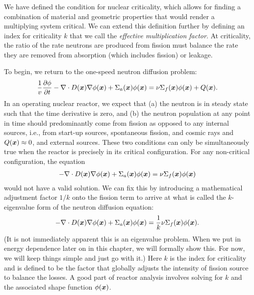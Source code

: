 We have defined the condition for nuclear criticality, which allows for finding a combination of material and geometric properties that would render a multiplying system critical. We can extend this definition further by defining an index for criticality $k$ that we call the \emph{effective multiplication factor}. At criticality, the ratio of the rate neutrons are produced from fission must balance the rate they are removed from absorption (which includes fission) or leakage. 

To begin, we return to the one-speed neutron diffusion problem:
\begin{align}
  \frac{1}{v} \frac{ \partial {\phi} }{ \partial {t} } - \nabla \cdot D(\bm{x})  \nabla \phi(\bm{x}) + \Sigma_a(\bm{x}) \phi(\bm{x}) = \nu \Sigma_f(\bm{x}) \phi(\bm{x}) + Q(\bm{x}). \nonumber
\end{align}
In an operating nuclear reactor, we expect that (a) the neutron is in steady state such that the time derivative is zero, and (b) the neutron population at any point in time should predominantly come from fission as opposed to any internal sources, i.e., from start-up sources, spontaneous fission, and cosmic rays and $Q(\bm{x}) \approx 0$, and external sources. These two conditions can only be simultaneously true when the reactor is precisely in its critical configuration. For any non-critical configuration, the equation 
\begin{align}
   - \nabla \cdot D(\bm{x})  \nabla \phi(\bm{x}) + \Sigma_a(\bm{x}) \phi(\bm{x}) = \nu \Sigma_f(\bm{x}) \phi(\bm{x})  \nonumber
\end{align}
would not have a valid solution. We can fix this by introducing a mathematical adjustment factor $1/k$ onto the fission term to arrive at what is called the $k$-eigenvalue form of the neutron diffusion equation:
\begin{align}
   - \nabla \cdot  D(\bm{x}) \nabla \phi(\bm{x}) + \Sigma_a(\bm{x}) \phi(\bm{x}) = \frac{1}{k} \nu \Sigma_f(\bm{x}) \phi(\bm{x}) .
\end{align}
(It is not immediately apparent this is an eigenvalue problem. When we put in energy dependence later on in this chapter, we will formally show this. For now, we will keep things simple and just go with it.)  Here $k$ is the index for criticality and is defined to be the factor that globally adjusts the intensity of fission source to balance the losses. A good part of reactor analysis involves solving for $k$ and the associated shape function $\phi(\bm{x})$.

